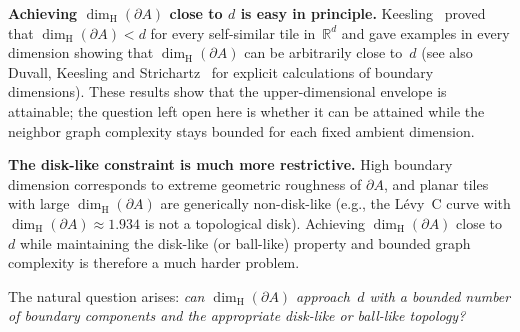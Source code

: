 \documentclass{amsart}
\theoremstyle{definition}
\theoremstyle{remark}
\newcommand{\R}{\mathbb{R}}
\newcommand{\dH}{\dim_{\mathrm{H}}}
\begin{document}
\textbf{Achieving $\dH(\partial A)$ close to $d$ is easy in principle.}
Keesling~\cite{keesling} proved that $\dH(\partial A) < d$ for every
self-similar tile in~$\R^d$ and gave examples in every dimension
showing that $\dH(\partial A)$ can be arbitrarily close to~$d$
(see also Duvall, Keesling and Strichartz~\cite{duvall-keesling-strichartz}
for explicit calculations of boundary dimensions).  These results
show that the upper-dimensional envelope is attainable; the question
left open here is whether it can be attained while the neighbor graph
complexity stays bounded for each fixed ambient dimension.

\textbf{The disk-like constraint is much more restrictive.}
High boundary dimension corresponds to extreme geometric roughness of
$\partial A$, and planar tiles with large $\dH(\partial A)$ are generically
non-disk-like (e.g., the L{\'e}vy~C curve with
$\dH(\partial A) \approx 1.934$ is not a topological disk).
Achieving $\dH(\partial A)$ close to~$d$ while maintaining the
disk-like (or ball-like) property and bounded graph complexity is therefore a much
harder problem.

The natural question arises: \emph{can $\dH(\partial A)$ approach~$d$
with a bounded number of boundary components and the appropriate
disk-like or ball-like topology?}
\end{document}
